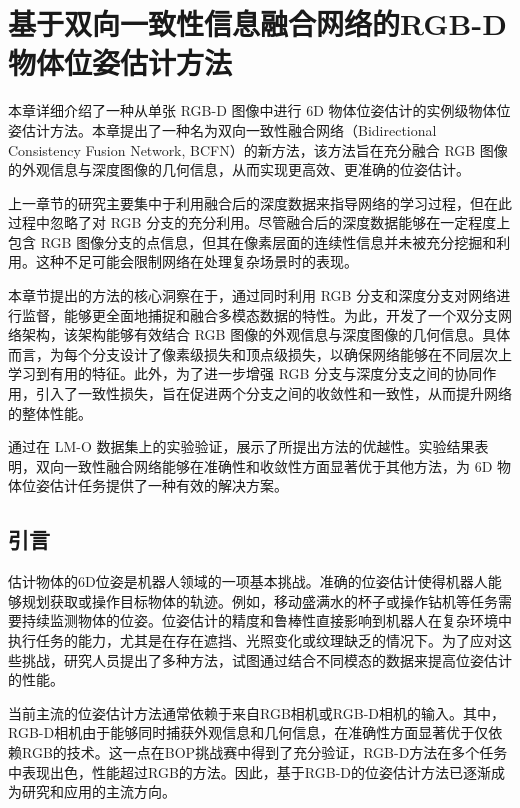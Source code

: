 \chapter{基于双向一致性信息融合网络的RGB-D物体位姿估计方法}

本章详细介绍了一种从单张 RGB-D 图像中进行 6D 物体位姿估计的实例级物体位姿估计方法。本章提出了一种名为双向一致性融合网络（Bidirectional Consistency Fusion Network, BCFN）的新方法，该方法旨在充分融合 RGB 图像的外观信息与深度图像的几何信息，从而实现更高效、更准确的位姿估计。

上一章节的研究主要集中于利用融合后的深度数据来指导网络的学习过程，但在此过程中忽略了对 RGB 分支的充分利用。尽管融合后的深度数据能够在一定程度上包含 RGB 图像分支的点信息，但其在像素层面的连续性信息并未被充分挖掘和利用。这种不足可能会限制网络在处理复杂场景时的表现。

本章节提出的方法的核心洞察在于，通过同时利用 RGB 分支和深度分支对网络进行监督，能够更全面地捕捉和融合多模态数据的特性。为此，开发了一个双分支网络架构，该架构能够有效结合 RGB 图像的外观信息与深度图像的几何信息。具体而言，为每个分支设计了像素级损失和顶点级损失，以确保网络能够在不同层次上学习到有用的特征。此外，为了进一步增强 RGB 分支与深度分支之间的协同作用，引入了一致性损失，旨在促进两个分支之间的收敛性和一致性，从而提升网络的整体性能。

通过在 LM-O 数据集上的实验验证，展示了所提出方法的优越性。实验结果表明，双向一致性融合网络能够在准确性和收敛性方面显著优于其他方法，为 6D 物体位姿估计任务提供了一种有效的解决方案。

\section{引言}

估计物体的6D位姿是机器人领域的一项基本挑战。准确的位姿估计使得机器人能够规划获取或操作目标物体的轨迹。例如，移动盛满水的杯子或操作钻机等任务需要持续监测物体的位姿。位姿估计的精度和鲁棒性直接影响到机器人在复杂环境中执行任务的能力，尤其是在存在遮挡、光照变化或纹理缺乏的情况下。为了应对这些挑战，研究人员提出了多种方法，试图通过结合不同模态的数据来提高位姿估计的性能。

当前主流的位姿估计方法通常依赖于来自RGB相机\cite{su2022zebrapose}或RGB-D相机\cite{2024hipose}的输入。其中，RGB-D相机由于能够同时捕获外观信息和几何信息，在准确性方面显著优于仅依赖RGB的技术。这一点在BOP挑战赛\cite{hodan2024bop}中得到了充分验证，RGB-D方法在多个任务中表现出色，性能超过RGB的方法。因此，基于RGB-D的位姿估计方法已逐渐成为研究和应用的主流方向。

